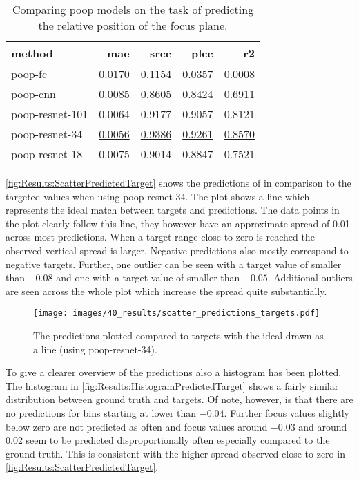 \begin{table}
    \centering
    \caption{Comparing \acs{poop} models on the task of predicting the relative position of the focus plane.}
    \begin{tabular}{lrrrr}
        \hline
        method          & \acs{mae} & \acs{srcc} & \acs{plcc} & \acs{r2} \\
        \hline
        \acs{poop}-\acs{fc}             & 0.0170 & 0.1154 & 0.0357 & 0.0008 \\
        \acs{poop}-\acs{cnn}            & 0.0085 & 0.8605 & 0.8424 & 0.6911 \\
        \acs{poop}-\acs{resnet}-101     & 0.0064 & 0.9177 & 0.9057 & 0.8121 \\
        \acs{poop}-\acs{resnet}-34      & \underline{0.0056} & \underline{0.9386} & \underline{0.9261} & \underline{0.8570} \\
        \acs{poop}-\acs{resnet}-18      & 0.0075 & 0.9014 & 0.8847 & 0.7521 \\
    \end{tabular}
    \label{tab:Results:Models:Accuracy}
\end{table}

\autoref{fig:Results:ScatterPredictedTarget} shows the predictions of in comparison to the targeted values when using \acs{poop}-\acs{resnet}-34. The plot shows a line which represents the ideal match between targets and predictions. The data points in the plot clearly follow this line, they however have an approximate spread of 0.01 across most predictions. When a target range close to zero is reached the observed vertical spread is larger. Negative predictions also mostly correspond to negative targets. Further, one outlier can be seen with a target value of smaller than $-0.08$ and one with a target value of smaller than $-0.05$. Additional outliers are seen across the whole plot which increase the spread quite substantially.


\begin{figure}
    \centering
    \texttt{[image: images/40\_results/scatter\_predictions\_targets.pdf]}
    \caption{The predictions plotted compared to targets with the ideal drawn as a line (using \acs{poop}-\acs{resnet}-34).}
    \label{fig:Results:ScatterPredictedTarget}
\end{figure}


To give a clearer overview of the predictions also a histogram has been plotted. The histogram in \autoref{fig:Results:HistogramPredictedTarget} shows a fairly similar distribution between ground truth and targets. Of note, however, is that there are no predictions for bins starting at lower than $-0.04$. Further focus values slightly below zero are not predicted as often and focus values around $-0.03$ and around $0.02$ seem to be predicted disproportionally often especially compared to the ground truth. This is consistent with the higher spread observed close to zero in \autoref{fig:Results:ScatterPredictedTarget}.

